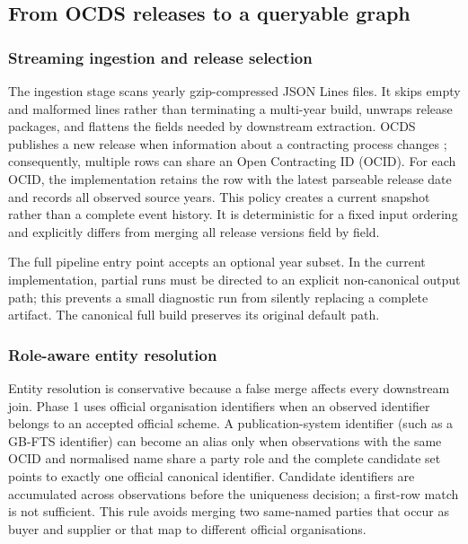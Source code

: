 \subsection{From OCDS releases to a queryable graph}
\label{sec:data-method}

\subsubsection{Streaming ingestion and release selection}

The ingestion stage scans yearly gzip-compressed JSON Lines files.  It skips empty and malformed
lines rather than terminating a multi-year build, unwraps release packages, and flattens the
fields needed by downstream extraction.  OCDS publishes a new release when information about a
contracting process changes \citep{ocds-standard}; consequently, multiple rows can share an Open
Contracting ID (OCID).  For each OCID, the implementation retains the row with the latest
parseable release date and records all observed source years.  This policy creates a current
snapshot rather than a complete event history.  It is deterministic for a fixed input ordering
and explicitly differs from merging all release versions field by field.

The full pipeline entry point accepts an optional year subset.  In the current implementation,
partial runs must be directed to an explicit non-canonical output path; this prevents a small
diagnostic run from silently replacing a complete artifact.  The canonical full build preserves
its original default path.

\subsubsection{Role-aware entity resolution}

Entity resolution is conservative because a false merge affects every downstream join.  Phase 1
uses official organisation identifiers when an observed identifier belongs to an accepted
official scheme.  A publication-system identifier (such as a GB-FTS identifier) can become an
alias only when observations with the same OCID and normalised name share a party role and the
complete candidate set points to exactly one official canonical identifier.  Candidate
identifiers are accumulated across observations before the uniqueness decision; a first-row
match is not sufficient.  This rule avoids merging two same-named parties that occur as buyer
and supplier or that map to different official organisations.

